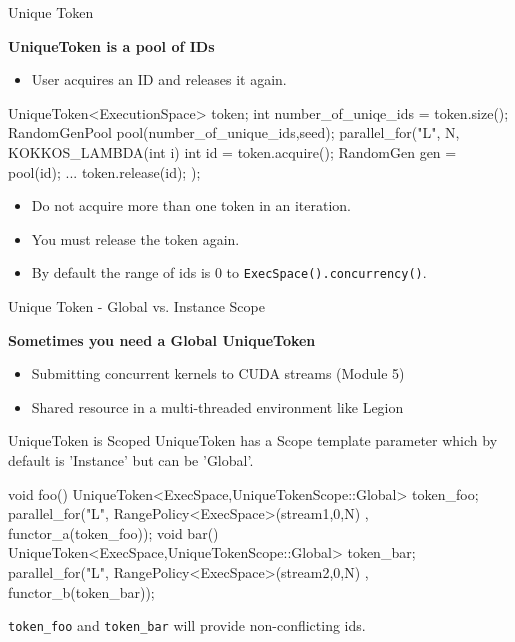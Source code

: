 \begin{frame}[fragile]{Unique Token}

\textbf{UniqueToken is a pool of IDs}

\begin{itemize}
\item User acquires an ID and releases it again.
\end{itemize}

   \begin{code}[frame=single, keywords={UniqueToken,size,acquire,release}]
    UniqueToken<ExecutionSpace> token;
    int number_of_uniqe_ids = token.size();
    RandomGenPool pool(number_of_unique_ids,seed);
    parallel_for("L", N, KOKKOS_LAMBDA(int i) {
      int id = token.acquire();
      RandomGen gen = pool(id);
      ...
      token.release(id);
    });
   \end{code}

\pause
\begin{itemize}
\item Do not acquire more than one token in an iteration.
\item You must release the token again.
\item By default the range of ids is 0 to \texttt{ExecSpace().concurrency()}.
\end{itemize}

\end{frame}


\begin{frame}[fragile]{Unique Token - Global vs. Instance Scope}

\textbf{Sometimes you need a Global UniqueToken}
\begin{itemize}
\item Submitting concurrent kernels to CUDA streams (Module 5)
\item Shared resource in a multi-threaded environment like Legion
\end{itemize}

\vspace{-5pt}
\pause
\begin{block}{UniqueToken is Scoped}
UniqueToken has a Scope template parameter which by default is 'Instance' but can be 'Global'.
\end{block}

\pause
   \begin{code}[frame=single, keywords={UniqueTokenScope,Global,stream1,stream2}]
void foo() {
  UniqueToken<ExecSpace,UniqueTokenScope::Global> token_foo;
  parallel_for("L", RangePolicy<ExecSpace>(stream1,0,N)
    , functor_a(token_foo));
}
void bar() {
  UniqueToken<ExecSpace,UniqueTokenScope::Global> token_bar;
  parallel_for("L", RangePolicy<ExecSpace>(stream2,0,N)
    , functor_b(token_bar));
}
   \end{code}

\pause
\texttt{token\_foo} and \texttt{token\_bar} will provide non-conflicting ids.
\end{frame}

